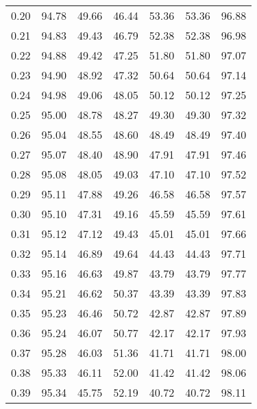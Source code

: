 \begin{tabular}{|c|c|c|c|c|c|c|}
      0.20 &     94.78 &     49.66 &      46.44 &   53.36 &      53.36 &         96.88 \\
      0.21 &     94.83 &     49.43 &      46.79 &   52.38 &      52.38 &         96.98 \\
      0.22 &     94.88 &     49.42 &      47.25 &   51.80 &      51.80 &         97.07 \\
      0.23 &     94.90 &     48.92 &      47.32 &   50.64 &      50.64 &         97.14 \\
      0.24 &     94.98 &     49.06 &      48.05 &   50.12 &      50.12 &         97.25 \\
      0.25 &     95.00 &     48.78 &      48.27 &   49.30 &      49.30 &         97.32 \\
      0.26 &     95.04 &     48.55 &      48.60 &   48.49 &      48.49 &         97.40 \\
      0.27 &     95.07 &     48.40 &      48.90 &   47.91 &      47.91 &         97.46 \\
      0.28 &     95.08 &     48.05 &      49.03 &   47.10 &      47.10 &         97.52 \\
      0.29 &     95.11 &     47.88 &      49.26 &   46.58 &      46.58 &         97.57 \\
      0.30 &     95.10 &     47.31 &      49.16 &   45.59 &      45.59 &         97.61 \\
      0.31 &     95.12 &     47.12 &      49.43 &   45.01 &      45.01 &         97.66 \\
      0.32 &     95.14 &     46.89 &      49.64 &   44.43 &      44.43 &         97.71 \\
      0.33 &     95.16 &     46.63 &      49.87 &   43.79 &      43.79 &         97.77 \\
      0.34 &     95.21 &     46.62 &      50.37 &   43.39 &      43.39 &         97.83 \\
      0.35 &     95.23 &     46.46 &      50.72 &   42.87 &      42.87 &         97.89 \\
      0.36 &     95.24 &     46.07 &      50.77 &   42.17 &      42.17 &         97.93 \\
      0.37 &     95.28 &     46.03 &      51.36 &   41.71 &      41.71 &         98.00 \\
      0.38 &     95.33 &     46.11 &      52.00 &   41.42 &      41.42 &         98.06 \\
      0.39 &     95.34 &     45.75 &      52.19 &   40.72 &      40.72 &         98.11 \\

\end{tabular}
